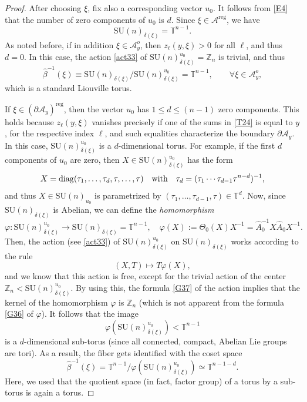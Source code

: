\documentclass[a4paper,11pt,reqno]{amsart}
\theoremstyle{definition}
\numberwithin{equation}{section}
\newcommand{\be}{\begin{equation}}
\newcommand{\ee}{\end{equation}}
\def\cA{{\mathcal A}}                       %
\def\bT{{\mathbb T}}                        %
\def\reg{\mathrm{reg}}                      %
\def\bZ{{\mathbb Z}}                        %
\def\diag{\mathrm{diag}}                    %
\def\SU{\mathrm{SU}}                        %
\def\reg{\mathrm{reg}}                      %
\begin{document}
\begin{proof}
After choosing $\xi$, fix also a corresponding vector $u_0$.
It follows from \eqref{E4} that the number of zero components of $u_0$ is $d$.
Since $\xi\in \cA^\reg$, we have
\be
\SU(n)_{\delta(\xi)} = \bT^{n-1}.
\label{G33}\ee
As noted before, if in addition $\xi\in \cA_y^o$, then   $z_\ell(y,\xi)>0$ for all $\ell$, and thus $d=0$.
In this case, the action \eqref{act33} of
$\SU(n)_{\delta(\xi)}^{u_0} = \bZ_n$ is trivial, and thus
\be
\hat \beta^{-1}(\xi) \equiv \SU(n)_{\delta(\xi)}/ \SU(n)_{\delta(\xi)}^{u_0} = \bT^{n-1}, \qquad \forall \xi \in \cA_y^o,
\label{G34}\ee
which is a standard Liouville torus.

If $\xi \in (\partial \cA_y)^\reg$, then the vector $u_0$ has $1\leq d\leq (n-1)$ zero components.
This holds because  $z_\ell(y,\xi)$ vanishes precisely if one of the sums in \eqref{T24} is equal to $y$,
for the respective index $\ell$, and such equalities characterize the boundary $\partial \cA_y$.
In this case,
$\SU(n)_{\delta(\xi)}^{u_0}$ is a $d$-dimensional torus. For example, if the first $d$ components of $u_0$ are zero, then
$X\in  \SU(n)_{\delta(\xi)}^{u_0}$ has the form
\be
X = \diag(\tau_1, \dots, \tau_d, \tau,\dots, \tau) \quad \hbox{with}\quad  \tau_d = (\tau_1\cdots \tau_{d-1} \tau^{n-d})^{-1},
\label{G35}\ee
and thus $X\in \SU(n)_{u_0}$ is parametrized by $(\tau_1,\dots, \tau_{d-1}, \tau) \in \bT^d$.
Now, since $\SU(n)_{\delta(\xi)}$ is Abelian,
we can define the \emph{homomorphism}
\be
\varphi: \SU(n)_{\delta(\xi)}^{u_0} \to \SU(n)_{\delta(\xi)} = \bT^{n-1},
\quad
\varphi(X):= \Theta_0(X) X^{-1} = \hat A_0^{-1} X \hat A_0 X^{-1}.
 \label{G36}\ee
Then, the action (see \eqref{act33}) of $\SU(n)_{\delta(\xi)}^{u_0}$ on $\SU(n)_{\delta(\xi)}$ works according to the rule
 \be
 (X,T) \mapsto T \varphi(X),
 \label{G37}\ee
 and we know that this action is free, except for the trivial action of the center $\bZ_n < \SU(n)_{\delta(\xi)}^{u_0}$.
 By using this, the formula \eqref{G37} of the action  implies that the kernel of the homomorphism
 $\varphi$ is  $\bZ_n$ (which is not apparent from the formula \eqref{G36} of $\varphi$).
 It follows that the image
 \be
 \varphi(\SU(n)_{\delta(\xi)}^{u_0}) < \bT^{n-1}
 \label{G38}\ee
  is  a $d$-dimensional sub-torus (since all connected, compact, Abelian Lie groups are tori).
 As a result, the fiber gets identified with the coset space
 \be
 \hat\beta^{-1}(\xi) = \bT^{n-1}/  \varphi(\SU(n)_{\delta(\xi)}^{u_0}) \simeq \bT^{n-1-d}.
 \label{G39}\ee
 Here, we used that the quotient space (in fact, factor group) of a torus by a sub-torus is again a torus.
 \end{proof}
\end{document}
